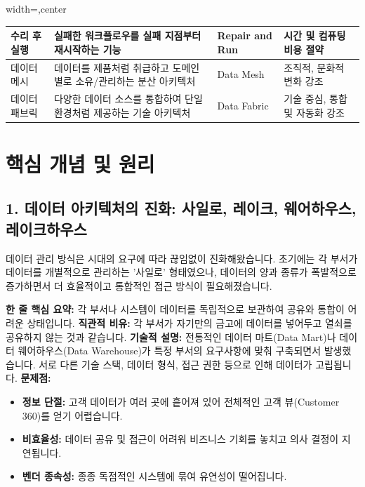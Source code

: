 \documentclass[11pt,a4paper]{article}
\begin{document}
\begin{tcolorbox}[title=\textbf{핵심 용어집}, colback=blue!5!white, colframe=blue!75!black, sharp corners, boxrule=0.8pt]
\begin{adjustbox}{width=\textwidth,center}
\begin{tabular}{llll}
수리 후 실행 & 실패한 워크플로우를 실패 지점부터 재시작하는 기능 & Repair and Run & 시간 및 컴퓨팅 비용 절약 \\
\midrule
데이터 메시 & 데이터를 제품처럼 취급하고 도메인별로 소유/관리하는 분산 아키텍처 & Data Mesh & 조직적, 문화적 변화 강조 \\
데이터 패브릭 & 다양한 데이터 소스를 통합하여 단일 환경처럼 제공하는 기술 아키텍처 & Data Fabric & 기술 중심, 통합 및 자동화 강조 \\
\bottomrule
\end{tabular}
\end{adjustbox}
\end{tcolorbox}

\newpage
\section*{핵심 개념 및 원리}

\subsection*{1. 데이터 아키텍처의 진화: 사일로, 레이크, 웨어하우스, 레이크하우스}

데이터 관리 방식은 시대의 요구에 따라 끊임없이 진화해왔습니다. 초기에는 각 부서가 데이터를 개별적으로 관리하는 '사일로' 형태였으나, 데이터의 양과 종류가 폭발적으로 증가하면서 더 효율적이고 통합적인 접근 방식이 필요해졌습니다.

\begin{tcolorbox}[title=\textbf{데이터 사일로 (Data Silo)}, colback=red!5!white, colframe=red!75!black, sharp corners, boxrule=0.8pt]
\textbf{한 줄 핵심 요약:} 각 부서나 시스템이 데이터를 독립적으로 보관하여 공유와 통합이 어려운 상태입니다.
\textbf{직관적 비유:} 각 부서가 자기만의 금고에 데이터를 넣어두고 열쇠를 공유하지 않는 것과 같습니다.
\textbf{기술적 설명:} 전통적인 데이터 마트(Data Mart)나 데이터 웨어하우스(Data Warehouse)가 특정 부서의 요구사항에 맞춰 구축되면서 발생했습니다. 서로 다른 기술 스택, 데이터 형식, 접근 권한 등으로 인해 데이터가 고립됩니다.
\textbf{문제점:}
\begin{itemize}
    \item \textbf{정보 단절:} 고객 데이터가 여러 곳에 흩어져 있어 전체적인 고객 뷰(Customer 360)를 얻기 어렵습니다.
    \item \textbf{비효율성:} 데이터 공유 및 접근이 어려워 비즈니스 기회를 놓치고 의사 결정이 지연됩니다.
    \item \textbf{벤더 종속성:} 종종 독점적인 시스템에 묶여 유연성이 떨어집니다.
\end{itemize}
\end{tcolorbox}
\end{document}

